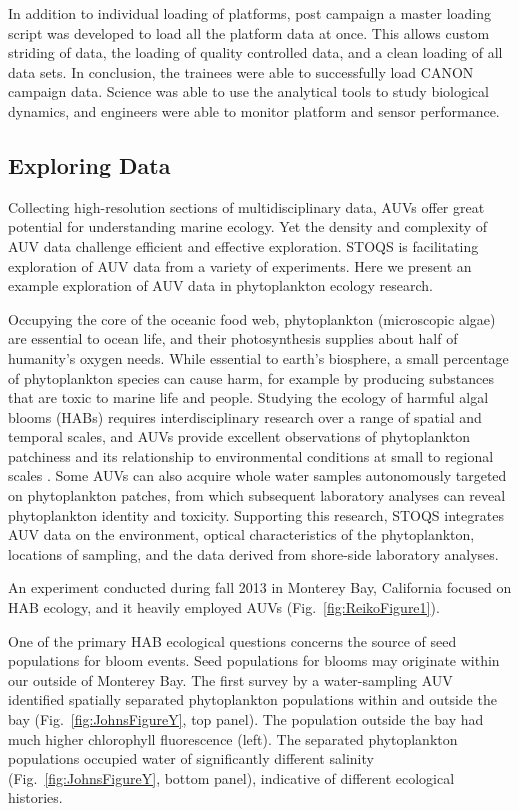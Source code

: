 In addition to individual loading of platforms, post campaign a master loading script was developed to load all the platform data at once.  This allows custom striding of data, the loading of quality controlled data, and a clean loading of all data sets.  In conclusion, the trainees were able to successfully load CANON campaign data.  Science was able to use the analytical tools to study biological dynamics, and engineers were able to monitor platform and sensor performance.  



\subsection{Exploring Data}
Collecting high-resolution sections of multidisciplinary data, AUVs offer great potential for understanding marine ecology.  Yet the density and complexity of AUV data challenge efficient and effective exploration.  STOQS is facilitating exploration of AUV data from a variety of experiments.  Here we present an example exploration of AUV data in phytoplankton ecology research.

Occupying the core of the oceanic food web, phytoplankton (microscopic algae) are essential to ocean life, and their photosynthesis supplies about half of humanity’s oxygen needs.  While essential to earth’s biosphere, a small percentage of phytoplankton species can cause harm, for example by producing substances that are toxic to marine life and people.  Studying the ecology of harmful algal blooms (HABs) requires interdisciplinary research over a range of spatial and temporal scales, and AUVs provide excellent observations of phytoplankton patchiness and its relationship to environmental conditions at small to regional scales \cite{Scholin2000}.  Some AUVs can also acquire whole water samples autonomously targeted on phytoplankton patches, from which subsequent laboratory analyses can reveal phytoplankton identity and toxicity.  Supporting this research, STOQS integrates AUV data on the environment, optical characteristics of the phytoplankton, locations of sampling, and the data derived from shore-side laboratory analyses.

An experiment conducted during fall 2013 in Monterey Bay, California focused on HAB ecology, and it heavily employed AUVs (Fig.~\ref{fig:ReikoFigure1}).  

One of the primary HAB ecological questions concerns the source of seed populations for bloom events.  Seed populations for blooms may originate within our outside of Monterey Bay.  The first survey by a water-sampling AUV identified spatially separated phytoplankton populations within and outside the bay (Fig.~\ref{fig:JohnsFigureY}, top panel).  The population outside the bay had much higher chlorophyll fluorescence (left).  The separated phytoplankton populations occupied water of significantly different salinity (Fig.~\ref{fig:JohnsFigureY}, bottom panel), indicative of different ecological histories.

